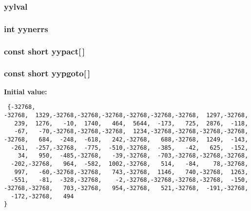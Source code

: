 \subsubsection{ yylval}\label{parser_8c_a191}


\subsubsection{\setlength{\rightskip}{0pt plus 5cm}int yynerrs}\label{parser_8c_a193}


\subsubsection{\setlength{\rightskip}{0pt plus 5cm}const short yypact[$\,$]\hspace{0.3cm}{\tt  [static]}}\label{parser_8c_a186}


\subsubsection{\setlength{\rightskip}{0pt plus 5cm}const short yypgoto[$\,$]\hspace{0.3cm}{\tt  [static]}}\label{parser_8c_a187}


{\bf Initial value:}

\footnotesize\begin{verbatim} {-32768,
-32768,  1329,-32768,-32768,-32768,-32768,-32768,-32768,  1297,-32768,
   239,  1276,   -10,  1740,   464,  5644,  -173,   725,  2876,  -118,
   -67,   -70,-32768,-32768,-32768,  1234,-32768,-32768,-32768,-32768,
-32768,   684,  -248,  -618,   242,-32768,   688,-32768,  1249,  -143,
  -261,  -257,-32768,  -775,  -510,-32768,  -385,   -42,   625,  -152,
    34,   950,  -485,-32768,   -39,-32768,  -703,-32768,-32768,-32768,
  -202,-32768,   964,  -582,  1002,-32768,   514,   -84,    78,-32768,
   997,   -60,-32768,-32768,   743,-32768,  1146,   740,-32768,  1263,
  -551,   -81,  -328,-32768,    -2,-32768,-32768,-32768,-32768,  -150,
-32768,-32768,   703,-32768,   954,-32768,   521,-32768,  -191,-32768,
  -172,-32768,   494
}\end{verbatim}\normalsize 
{}
